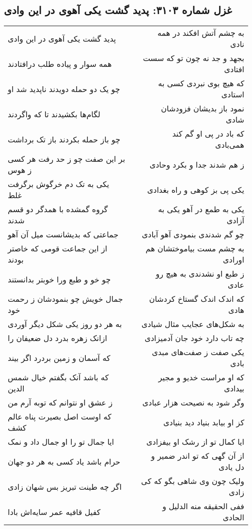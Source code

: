 \begin{center}
\section*{غزل شماره ۳۱۰۳: پدید گشت یکی آهوی در این وادی}
\label{sec:3103}
\begin{longtable}{l p{0.5cm} r}
پدید گشت یکی آهوی در این وادی
&&
به چشم آتش افکند در همه نادی
\\
همه سوار و پیاده طلب درافتادند
&&
بجهد و جد نه چون تو که سست افتادی
\\
چو یک دو حمله دویدند ناپدید شد او
&&
که هیچ بوی نبردی کسی به استادی
\\
لگام‌ها بکشیدند تا که واگردند
&&
نمود باز بدیشان فزودشان شادی
\\
چو باز حمله بکردند باز تک برداشت
&&
که باد در پی او گم کند همی‌بادی
\\
بر این صفت چو ز حد رفت هر کسی ز هوس
&&
ز هم شدند جدا و بکرد وحادی
\\
یکی به تک دم خرگوش برگرفت غلط
&&
یکی پی بز کوهی و راه بغدادی
\\
گروه گمشده با همدگر دو قسم شدند
&&
یکی به طمع در آهو یکی به آزادی
\\
جماعتی که بدیشانست میل آن آهو
&&
چو گم شدندی بنمودی آهو آبادی
\\
از این جماعت قومی که خاصتر بودند
&&
به چشم مست بیاموختشان هم اورادی
\\
چو خو و طبع ورا خوبتر بدانستند
&&
ز طبع او نشدندی به هیچ رو عادی
\\
جمال خویش چو بنمودشان ز رحمت خود
&&
که اندک اندک گستاخ کردشان هادی
\\
به هر دو روز یکی شکل دیگر آوردی
&&
به شکل‌های عجایب مثال شیادی
\\
ازانک زهره بدرد دل ضعیفان را
&&
چه تاب دارد خود جان آدمیزادی
\\
که آسمان و زمین بردرد اگر بیند
&&
یکی صفت ز صفت‌های مبدی بادی
\\
که باشد آنک بگفتم خیال شمس الدین
&&
که او مراست خدیو و مجیر بیدادی
\\
ز عشق او نتوانم که توبه آرم من
&&
وگر شود به نصیحت هزار عبادی
\\
که اوست اصل بصیرت پناه عالم کشف
&&
کز او بیابد بنیاد دید بنیادی
\\
ایا جمال تو را او جمال داد و نمک
&&
ایا کمال تو از رشک او بیفزادی
\\
حرام باشد یاد کسی به هر دو جهان
&&
از آن گهی که تو اندر ضمیر و دل یادی
\\
اگر چه طینت تبریز بس شهان زادی
&&
ولیک چون وی شاهی بگو که کی زادی
\\
کفیل قافیه عمر سایه‌اش بادا
&&
ففی الحقیقه منه الدلیل و الحادی
\\
\end{longtable}
\end{center}
